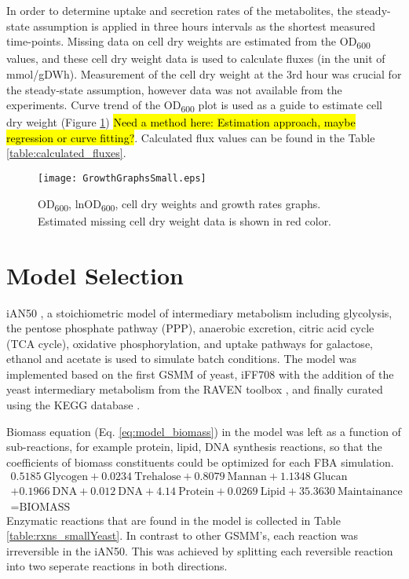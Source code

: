 In order to determine uptake and secretion rates of the metabolites, the steady-state assumption is applied in three hours intervals as the shortest measured time-points. Missing data on cell dry weights are estimated from the OD\textsubscript{600} values, and these cell dry weight data is used to calculate fluxes (in the unit of mmol/gDWh). Measurement of the cell dry weight at the 3rd hour was crucial for the steady-state assumption, however data was not available from the experiments. Curve trend of the OD\textsubscript{600} plot is used as a guide to estimate cell dry weight (Figure \ref{fig:GrowthGraphs}) \hl{Need a method here: Estimation approach, maybe regression or curve fitting?}. Calculated flux values can be found in the Table \ref{table:calculated_fluxes}.
\begin{figure}[H]
  \begin{center}
  \texttt{[image: GrowthGraphsSmall.eps]}
  \end{center}
  \caption[OD\textsubscript{600}, lnOD\textsubscript{600}, cell dry weights and growth rates]{OD\textsubscript{600}, lnOD\textsubscript{600}, cell dry weights and growth rates graphs. Estimated missing cell dry weight data is shown in red color.}
\label{fig:GrowthGraphs}
\end{figure}



\section{Model Selection}
iAN50 \cite{nilsson2016metabolic}, a stoichiometric model of intermediary metabolism including glycolysis, the pentose phosphate pathway (PPP), anaerobic excretion, citric acid cycle (TCA cycle), oxidative phosphorylation, and uptake pathways for galactose, ethanol and acetate is used to simulate batch conditions. The model was implemented based on the first GSMM of yeast, iFF708 \cite{forster2003genome} with the addition of the yeast intermediary metabolism from the RAVEN toolbox \cite{agren2013raven}, and finally curated using the KEGG database \cite{kanehisa2000kegg}.

Biomass equation (Eq. \ref{eq:model_biomass}) in the model was left as a function of sub-reactions, for example protein, lipid, DNA synthesis reactions, so that the coefficients of biomass constituents could be optimized for each FBA simulation.
\begin{multline}
  0.5185\ \textrm{Glycogen} + 0.0234\ \textrm{Trehalose} + 0.8079\ \textrm{Mannan} + 1.1348\ \textrm{Glucan} \\
  + 0.1966\ \textrm{DNA} + 0.012\ \textrm{DNA} +  4.14\ \textrm{Protein} + 0.0269\ \textrm{Lipid} + 35.3630 \ \textrm{Maintainance} \\
  = \textrm{BIOMASS}
   \label{eq:model_biomass}
\end{multline}
Enzymatic reactions that are found in the model is collected in Table \ref{table:rxns_smallYeast}. In contrast to other GSMM's, each reaction was irreversible in the iAN50. This was achieved by splitting each reversible reaction into two seperate reactions in both directions.


